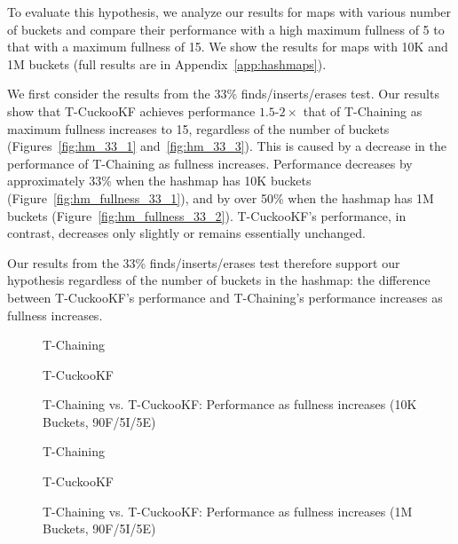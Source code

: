 To evaluate this hypothesis, we analyze our results for maps with various number of buckets and compare their performance with a high maximum fullness of 5 to that with a maximum fullness of 15. We show the results for maps with 10K and 1M buckets (full results are in Appendix~\ref{app:hashmaps}).

We first consider the results from the 33\% finds/inserts/erases test. Our results show that T-CuckooKF achieves performance $1.5$-$2\times$ that of T-Chaining as maximum fullness increases to 15, regardless of the number of buckets (Figures~\ref{fig:hm_33_1} and~\ref{fig:hm_33_3}). 
This is caused by a decrease in the performance of T-Chaining as fullness increases. Performance decreases by approximately 33\% when the hashmap has 10K buckets (Figure~\ref{fig:hm_fullness_33_1}), and by over 50\% when the hashmap has 1M buckets (Figure~\ref{fig:hm_fullness_33_2}). T-CuckooKF's performance, in contrast, decreases only slightly or remains essentially unchanged.

Our results from the 33\% finds/inserts/erases test therefore support our hypothesis regardless of the number of buckets in the hashmap: the difference between T-CuckooKF's performance and T-Chaining's performance increases as fullness increases. 

\begin{figure}[H]
    \centering
    \begin{minipage}{0.7\textwidth}
    \caption*{T-Chaining}
        \vspace{12pt}
    \end{minipage}
    \begin{minipage}{0.7\textwidth}
    \caption*{T-CuckooKF}
    \end{minipage}
    \caption{T-Chaining vs. T-CuckooKF: Performance as fullness increases (10K Buckets, 90F/5I/5E)}
    \label{fig:hm_fullness_90_1}
\end{figure}

\begin{figure}[H]
    \centering
    \begin{minipage}{0.70\textwidth}
    \caption*{T-Chaining}
        \vspace{12pt}
    \end{minipage}
    \begin{minipage}{0.70\textwidth}
    \caption*{T-CuckooKF}
    \end{minipage}
    \caption{T-Chaining vs. T-CuckooKF: Performance as fullness increases (1M Buckets, 90F/5I/5E)}
    \label{fig:hm_fullness_90_2}
\end{figure}

